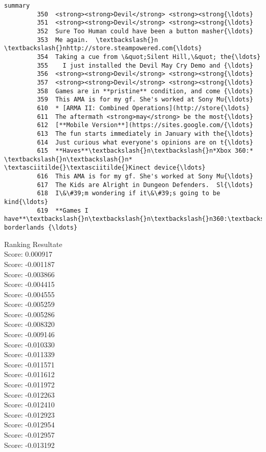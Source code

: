 \documentclass[11pt]{article}
\begin{document}
\begin{Verbatim}[commandchars=\\\{\}]
                                                        summary  
         350  <strong><strong>Devil</strong> <strong><strong{\ldots}  
         351  <strong><strong>Devil</strong> <strong><strong{\ldots}  
         352  Sure Too Human could have been a button masher{\ldots}  
         353  Me again.  \textbackslash{}n  \textbackslash{}nhttp://store.steampowered.com{\ldots}  
         354  Taking a cue from \&quot;Silent Hill,\&quot; the{\ldots}  
         355    I just installed the Devil May Cry Demo and {\ldots}  
         356  <strong><strong>Devil</strong> <strong><strong{\ldots}  
         357  <strong><strong>Devil</strong> <strong><strong{\ldots}  
         358  Games are in **pristine** condition, and come {\ldots}  
         359  This AMA is for my gf. She's worked at Sony Mu{\ldots}  
         610  * [ARMA II: Combined Operations](http://store{\ldots}  
         611  The aftermath <strong>may</strong> be the most{\ldots}  
         612  [**Mobile Version**](https://sites.google.com/{\ldots}  
         613  The fun starts immediately in January with the{\ldots}  
         614  Just curious what everyone's opinions are on t{\ldots}  
         615  **Haves**\textbackslash{}n\textbackslash{}n*Xbox 360:* \textbackslash{}n\textbackslash{}n* \textasciitilde{}\textasciitilde{}Kinect device{\ldots}  
         616  This AMA is for my gf. She's worked at Sony Mu{\ldots}  
         617  The Kids are Alright in Dungeon Defenders.  Sl{\ldots}  
         618  I\&\#39;m wondering if it\&\#39;s going to be kind{\ldots}  
         619  **Games I have**\textbackslash{}n\textbackslash{}n\textbackslash{}n360:\textbackslash{}n\textbackslash{}n\textbackslash{}n* borderlands {\ldots}  
\end{Verbatim}
            
    Ranking Resultate\\
Score: 0.000917\\
Score: -0.001187\\
Score: -0.003866\\
Score: -0.004415\\
Score: -0.004555\\
Score: -0.005259\\
Score: -0.005286\\
Score: -0.008320\\
Score: -0.009146\\
Score: -0.010330\\
Score: -0.011339\\
Score: -0.011571\\
Score: -0.011612\\
Score: -0.011972\\
Score: -0.012263\\
Score: -0.012410\\
Score: -0.012923\\
Score: -0.012954\\
Score: -0.012957\\
Score: -0.013192
\end{document}
